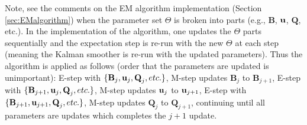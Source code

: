 \documentclass[]{article}
\def\BB{\mbox{$\mathbf B$}}	\def\bb{\mbox{$\mathbf b$}}
\def\QQ{\mbox{$\mathbf Q$}}	 \def\qq{\mbox{$\mathbf q$}}
\begin{document}
Note, see the comments on the EM algorithm implementation (Section \ref{sec:EMalgorithm}) when the parameter set $\Theta$ is broken into parts (e.g., $\BB$, $\mbox{$\mathbf u$}$, $\QQ$, etc.). In the implementation of the algorithm, one updates the $\Theta$ parts sequentially and the expectation step is re-run with the new $\Theta$ at each step (meaning the Kalman smoother is re-run with the updated parameters). Thus the algorithm is applied as follows (order that the parameters are updated is unimportant): E-step with $\{\BB_j, \uu_j, \QQ_j, etc.\}$, M-step updates $\BB_j$ to $\BB_{j+1}$, E-step with $\{\BB_{j+1}, \uu_j, \QQ_j, etc.\}$, M-step updates $\mbox{$\mathbf u$}_j$ to $\mbox{$\mathbf u$}_{j+1}$, E-step with $\{\BB_{j+1}, \uu_{j+1}, \QQ_j, etc.\}$, M-step updates $\QQ_j$ to $\QQ_{j+1}$, continuing until all parameters are updates which completes the $j+1$ update.
\end{document}
